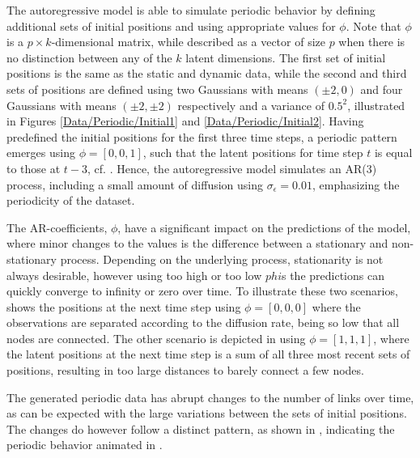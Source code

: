         The autoregressive model is able to simulate periodic behavior by defining additional sets of initial positions and using appropriate values for $\phi$. Note that $\phi$ is a $p\times k$-dimensional matrix, while described as a vector of size $p$ when there is no distinction between any of the $k$ latent dimensions.
        The first set of initial positions is the same as the static and dynamic data, while the second and third sets of positions are defined using two Gaussians with means $(\pm2,0)$ and four Gaussians with means $(\pm2,\pm2)$ respectively and a variance of $0.5^2$, illustrated in Figures \ref{Data/Periodic/Initial1} and \ref{Data/Periodic/Initial2}.
        Having predefined the initial positions for the first three time steps, a periodic pattern emerges using $\phi=[0, 0, 1]$, such that the latent positions for time step $t$ is equal to those at $t-3$, cf. .
        Hence, the autoregressive model simulates an AR(3) process, including a small amount of diffusion using $\sigma_\epsilon=0.01$, emphasizing the periodicity of the dataset.
        
        The AR-coefficients, $\phi$, have a significant impact on the predictions of the model, where minor changes to the values is the difference between a stationary and non-stationary process. Depending on the underlying process, stationarity is not always desirable, however using too high or too low $phi$s the predictions can quickly converge to infinity or zero over time. 
        To illustrate these two scenarios,  shows the positions at the next time step using $\phi=[0,0,0]$ where the observations are separated according to the diffusion rate, being so low that all nodes are connected. 
        The other scenario is depicted in  using $\phi=[1,1,1]$, where the latent positions at the next time step is a sum of all three most recent sets of positions, resulting in too large distances to barely connect a few nodes.
        
        The generated periodic data has abrupt changes to the number of links over time, as can be expected with the large variations between the sets of initial positions. The changes do however follow a distinct pattern, as shown in , indicating the periodic behavior animated in .
        
